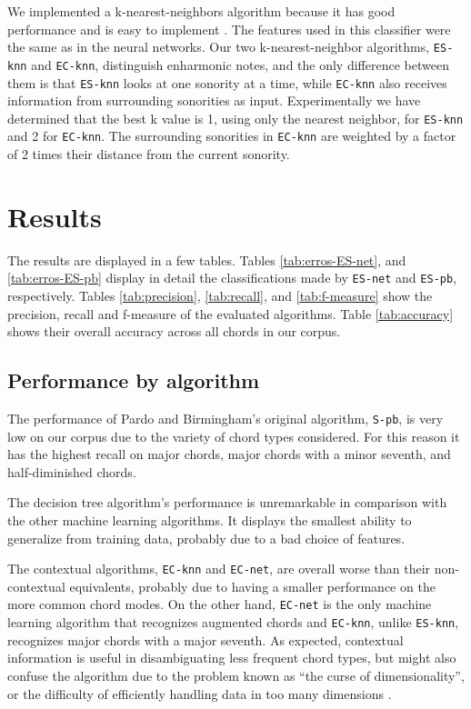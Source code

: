 \documentclass{article}
\begin{document}
We implemented a k-nearest-neighbors algorithm because it has good
performance and is easy to implement \cite{fix.ea89:important,
  gomez.ea04:estimating}. The features used in this classifier were the
same as in the neural networks. Our two k-nearest-neighbor algorithms,
\texttt{ES-knn} and \texttt{EC-knn}, distinguish enharmonic notes, and
the only difference between them is that \texttt{ES-knn} looks at one
sonority at a time, while \texttt{EC-knn} also receives information
from surrounding sonorities as input. Experimentally we have
determined that the best k value is 1, using only the nearest
neighbor, for \texttt{ES-knn} and 2 for \texttt{EC-knn}. The
surrounding sonorities in \texttt{EC-knn} are weighted by a factor of
2 times their distance from the current sonority.

\section{Results}
\label{sec:discussion}

The results are displayed in a few tables. Tables
\ref{tab:erros-ES-net}, and \ref{tab:erros-ES-pb} display in detail
the classifications made by \texttt{ES-net} and \texttt{ES-pb},
respectively. Tables \ref{tab:precision}, \ref{tab:recall}, and
\ref{tab:f-measure} show the precision, recall and f-measure of the
evaluated algorithms. Table \ref{tab:accuracy} shows their overall
accuracy across all chords in our corpus.

\subsection{Performance by algorithm}
\label{sec:algo-perf}

The performance of Pardo and Birmingham's original algorithm,
\texttt{S-pb}, is very low on our corpus due to the variety of chord
types considered. For this reason it has the highest recall on major
chords, major chords with a minor seventh, and half-diminished chords.

The decision tree algorithm's performance is unremarkable in
comparison with the other machine learning algorithms. It displays the
smallest ability to generalize from training data, probably due to a
bad choice of features.

The contextual algorithms, \texttt{EC-knn} and \texttt{EC\--net}, are
overall worse than their non-contextual equivalents, probably due to
having a smaller performance on the more common chord modes. On the
other hand, \texttt{EC-net} is the only machine learning algorithm
that recognizes augmented chords and \texttt{EC\--knn}, unlike
\texttt{ES-knn}, recognizes major chords with a major seventh. As
expected, contextual information is useful in disambiguating less
frequent chord types, but might also confuse the algorithm due to the
problem known as ``the curse of dimensionality'', or the difficulty of
efficiently handling data in too many dimensions
\cite{duda.ea00:pattern}.
\end{document}

